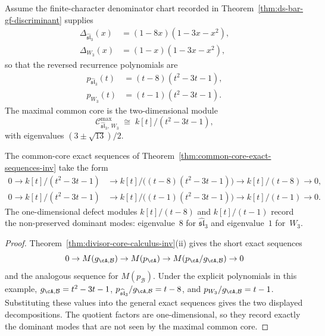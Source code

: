 Assume the finite-character denominator chart recorded in
Theorem~\ref{thm:ds-bar-gf-discriminant} supplies
\begin{align*}
\Delta_{\widehat{\mathfrak{sl}}_3}(x)
 &= (1-8x)(1-3x-x^2), \\
\Delta_{W_3}(x)
 &= (1-x)(1-3x-x^2),
\end{align*}
so that the reversed recurrence polynomials are
\begin{align*}
p_{\widehat{\mathfrak{sl}}_3}(t)
 &= (t-8)(t^2-3t-1), \\
p_{W_3}(t)
 &= (t-1)(t^2-3t-1).
\end{align*}
The maximal common core is the two-dimensional module
\[
\mathcal{C}^{\max}_{\widehat{\mathfrak{sl}}_3,\,W_3}
 \;\cong\;
 k[t]/(t^2-3t-1),
\]
with eigenvalues
$(3 \pm \sqrt{13})/2$.

\begin{proposition}
\label{prop:sl3-w3-defect-inv}
The common-core exact sequences of
Theorem~\ref{thm:common-core-exact-sequences-inv} take the
form
\begin{align*}
0 \to k[t]/(t^2{-}3t{-}1)
 &\longrightarrow k[t]/\bigl((t{-}8)(t^2{-}3t{-}1)\bigr)
 \longrightarrow k[t]/(t{-}8)
 \longrightarrow 0, \\[2pt]
0 \to k[t]/(t^2{-}3t{-}1)
 &\longrightarrow k[t]/\bigl((t{-}1)(t^2{-}3t{-}1)\bigr)
 \longrightarrow k[t]/(t{-}1)
 \longrightarrow 0.
\end{align*}
The one-dimensional defect modules $k[t]/(t-8)$ and
$k[t]/(t-1)$ record the non-preserved dominant modes:
eigenvalue~$8$ for
$\widehat{\mathfrak{sl}}_3$ and eigenvalue~$1$ for~$W_3$.
\end{proposition}

\begin{proof}
Theorem~\ref{thm:divisor-core-calculus-inv}(ii) gives the short exact
sequences
\[
0\to M(g_{\cA,\mathcal{B}})\to M(p_\cA)\to
M(p_\cA/g_{\cA,\mathcal{B}})\to 0
\]
and the analogous sequence for $M(p_\mathcal{B})$.
Under the explicit polynomials in this example,
$g_{\cA,\mathcal{B}}=t^2-3t-1$,
$p_{\widehat{\mathfrak{sl}}_3}/g_{\cA,\mathcal{B}}=t-8$, and
$p_{W_3}/g_{\cA,\mathcal{B}}=t-1$.
Substituting these values into the general exact sequences gives the
two displayed decompositions.
The quotient factors are one-dimensional, so they record exactly the
dominant modes that are not seen by the maximal common core.
\end{proof}

